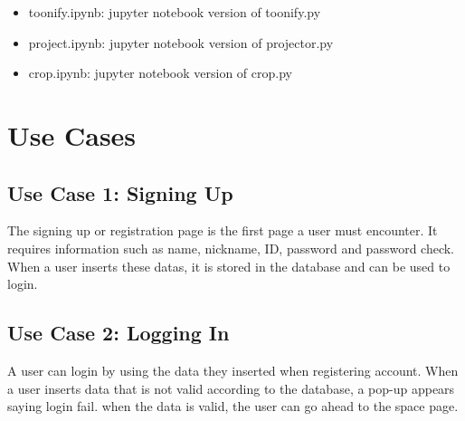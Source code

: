 \documentclass[conference]{IEEEtran}
\begin{document}
\begin{itemize}
                \vspace{3mm}
                \item toonify.ipynb: jupyter notebook version of toonify.py\\
                \item project.ipynb: jupyter notebook version of projector.py\\
                \item crop.ipynb: jupyter notebook version of crop.py\\

            \end{itemize}
    
\section{Use Cases}
    \subsection{Use Case 1: Signing Up}
        The signing up or registration page is the first page a user must encounter. It requires information such as name, nickname, ID, password and password check. When a user inserts these datas, it is stored in the database and can be used to login.\\
    \subsection{Use Case 2: Logging In}
        A user can login by using the data they inserted when registering account. When a user inserts data that is not valid according to the database, a pop-up appears saying login fail. when the data is valid, the user can go ahead to the space page.\\
\end{document}
